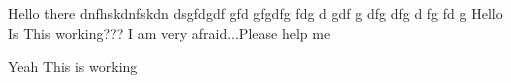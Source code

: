 \documentclass[12pt, a4paper]{article}
\begin{document}
Hello there
dnfhskdnfskdn
dsgfdgdf
gfd
gfgdfg
fdg
d
gdf
g
dfg
dfg
d
fg
fd
g
Hello Is This working???
I am very afraid...Please help me

Yeah This is working
\end{document}
